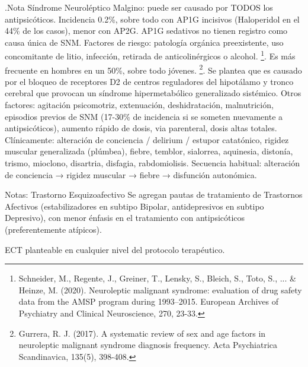 \documentclass[encares.tex]{subfiles}
\begin{document}
.Nota
Síndrome Neuroléptico Malgino: puede ser causado por TODOS los antipsicóticos. Incidencia 0.2\%, sobre todo con AP1G incisivos (Haloperidol en el 44\% de los casos), menor con AP2G. AP1G sedativos no tienen registro como causa única de SNM. Factores de riesgo: patología orgánica preexistente, uso concomitante de litio, infección, retirada de anticolinérgicos o alcohol. \footnote{Schneider, M., Regente, J., Greiner, T., Lensky, S., Bleich, S., Toto, S., ... \& Heinze, M. (2020). Neuroleptic malignant syndrome: evaluation of drug safety data from the AMSP program during 1993–2015. European Archives of Psychiatry and Clinical Neuroscience, 270, 23-33.}. Es más frecuente en hombres en un 50\%, sobre todo jóvenes. \footnote{Gurrera, R. J. (2017). A systematic review of sex and age factors in neuroleptic malignant syndrome diagnosis frequency. Acta Psychiatrica Scandinavica, 135(5), 398-408.}. Se plantea que es causado por el bloqueo de receptores D2 de centros reguladores del hipotálamo y tronco cerebral que provocan un síndrome hipermetabólico generalizado sistémico. Otros factores: agitación psicomotriz, extenuación, deshidratación, malnutrición, episodios previos de SNM (17-30\% de incidencia si se someten nuevamente a antipsicóticos), aumento rápido de dosis, via parenteral, dosis altas totales. Clínicamente: alteración de conciencia / delirium / estupor catatónico, rigidez muscular generalizada (plúmbea), fiebre, temblor, sialorrea, aquinesia, distonía, trismo, mioclono, disartria, disfagia, rabdomiolisis. Secuencia habitual: alteración de conciencia → rigidez muscular → fiebre → disfunción autonómica.

Notas: Trastorno Esquizoafectivo Se agregan pautas de tratamiento de Trastornos Afectivos (estabilizadores en subtipo Bipolar, antidepresivos en subtipo Depresivo), con menor énfasis en el tratamiento con antipsicóticos (preferentemente atípicos).

ECT planteable en cualquier nivel del protocolo terapéutico.
\end{document}
